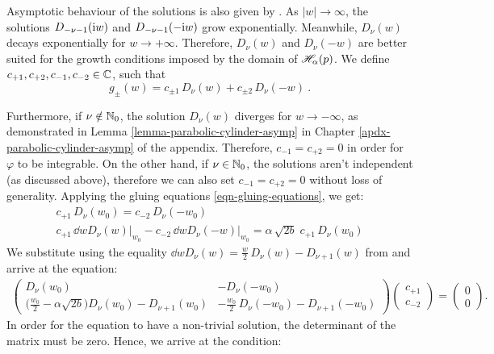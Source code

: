 Asymptotic behaviour of the solutions is also given by \cite{GradshteynRyzhik}. As $|w|\to\infty$, the solutions $D_{-\nu-1}(\mathrm{i} w)$ and $D_{-\nu-1}(-\mathrm{i} w)$ grow exponentially. Meanwhile, $D_\nu(w)$ decays exponentially for $w \to +\infty$. Therefore, $D_\nu(w)$ and $D_\nu(-w)$ are better suited for the growth conditions imposed by the domain of $\mathscr{H}_\alpha(p)$. We define $c_{+1}, c_{+2}, c_{-1}, c_{-2} \in \mathbb{C}$, such that
\begin{equation}
    g_\pm(w) = c_{\pm 1} \, D_\nu(w) + c_{\pm 2} \, D_\nu(-w) \: .
    \label{eqn-dirac-parabolic-cylinder-two-solutions}
\end{equation}

Furthermore, if $\nu \notin \mathbb{N}_0$, the solution $D_\nu(w)$ diverges for $w \to -\infty$, as demonstrated in Lemma \ref{lemma-parabolic-cylinder-asymp} in Chapter \ref{apdx-parabolic-cylinder-asymp} of the appendix. Therefore, $c_{-1} = c_{+2} = 0$ in order for $\varphi$ to be integrable. On the other hand, if $\nu \in \mathbb{N}_0$, the solutions aren't independent (as discussed above), therefore we can also set $c_{-1} = c_{+2} = 0$ without loss of generality. Applying the gluing equations \eqref{eqn-gluing-equations}, we get:
\begin{gather*}
    c_{+1} \, D_\nu(w_0) = c_{-2} \, D_\nu(-w_0) \\[5pt]
    c_{+1} \, \dd{}{w} D_\nu(w) \big|_{w_0} - c_{-2} \, \dd{}{w} D_\nu(-w) \big|_{w_0} = \alpha \, \sqrt{2b} \; c_{+1} \, D_\nu(w_0)
\end{gather*}
We substitute using the equality $\dd{}{w} D_\nu(w) = \frac{w}{2} \, D_\nu(w) - D_{\nu+1}(w)$ from \cite{GradshteynRyzhik} and arrive at the equation:
\begin{align*}
    \begin{pmatrix}
        D_\nu(w_0) & -D_\nu(-w_0) \\[5pt]
        \big( \frac{w_0}{2} \!-\! \alpha \sqrt{2b} \big)
        D_\nu(w_0) \!-\! D_{\nu+1}(w_0) &
        -\frac{w_0}{2} \, D_\nu(-w_0) \!-\! D_{\nu+1}(-w_0)
    \end{pmatrix}
    \begin{pmatrix}
        c_{+1} \\[5pt] c_{-2}
    \end{pmatrix}
    =
    \begin{pmatrix}
        0 \\[5pt] 0
    \end{pmatrix}
    .
\end{align*}
In order for the equation to have a non-trivial solution, the determinant of the matrix must be zero. Hence, we arrive at the condition:
